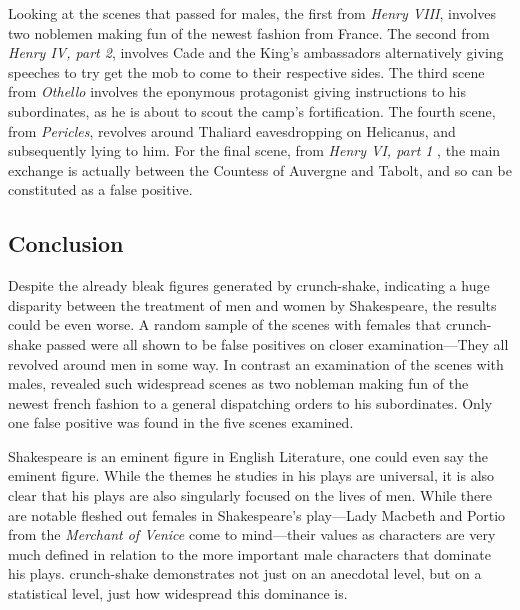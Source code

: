 \documentclass[12pt]{article}
\begin{document}
Looking at the scenes that passed for males, the first from \emph{Henry VIII},
involves two noblemen making fun of the newest fashion from France. The second
from \emph{Henry IV, part 2}, involves Cade and the King's ambassadors
alternatively giving speeches to try get the mob to come to their respective
sides. The third scene from \emph{Othello} involves the eponymous protagonist
giving instructions to his subordinates, as he is about to scout the camp's
fortification. The fourth scene, from \emph{Pericles}, revolves around Thaliard
eavesdropping on Helicanus, and subsequently lying to him. For the final scene,
from \emph{Henry VI, part 1} , the main exchange is actually between the
Countess of Auvergne and Tabolt, and so can be constituted as a false positive.

\subsection{Conclusion} 
\label{sub:conclusion}

Despite the already bleak figures generated by crunch-shake, indicating a huge
disparity between the treatment of men and women by Shakespeare, the results
could be even worse. A random sample of the scenes with females that
crunch-shake passed were all shown to be false positives on closer
examination---They all revolved around men in some way. In contrast an
examination of the scenes with males, revealed such widespread scenes as two
nobleman making fun of the newest french fashion to a general dispatching
orders to his subordinates. Only one false positive was found in the five
scenes examined.

Shakespeare is an eminent figure in English Literature, one could even say the
eminent figure. While the themes he studies in his plays are universal, it is
also clear that his plays are also singularly focused on the lives of men.
While there are notable fleshed out females in Shakespeare's play---Lady
Macbeth and Portio from the \emph{Merchant of Venice} come to mind---their
values as characters are very much defined in relation to the more important
male characters that dominate his plays. crunch-shake demonstrates not just on
an anecdotal level, but on a statistical level, just how widespread this
dominance is.

 
 
\end{document}
